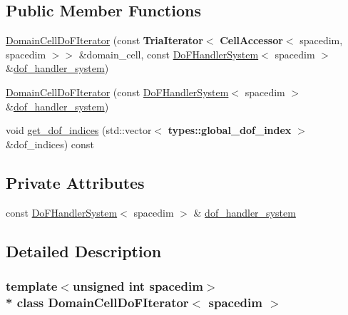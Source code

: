 \subsection*{Public Member Functions}
\begin{DoxyCompactItemize}
\item 
\hyperlink{class_domain_cell_do_f_iterator_a36416883d4c91dd0849520d3e205dba1}{Domain\+Cell\+Do\+F\+Iterator} (const {\bf Tria\+Iterator}$<$ {\bf Cell\+Accessor}$<$ spacedim, spacedim $>$$>$ \&domain\+\_\+cell, const \hyperlink{class_do_f_handler_system}{Do\+F\+Handler\+System}$<$ spacedim $>$ \&\hyperlink{class_domain_cell_do_f_iterator_a7431a0505f1e5b0b796c7f58cf9a060c}{dof\+\_\+handler\+\_\+system})
\item 
\hyperlink{class_domain_cell_do_f_iterator_a4e987bc73bb2c8ec6974cc6427505091}{Domain\+Cell\+Do\+F\+Iterator} (const \hyperlink{class_do_f_handler_system}{Do\+F\+Handler\+System}$<$ spacedim $>$ \&\hyperlink{class_domain_cell_do_f_iterator_a7431a0505f1e5b0b796c7f58cf9a060c}{dof\+\_\+handler\+\_\+system})
\item 
void \hyperlink{class_domain_cell_do_f_iterator_ad93f1a26a4efd4ca94af45d13e250aba}{get\+\_\+dof\+\_\+indices} (std\+::vector$<$ {\bf types\+::global\+\_\+dof\+\_\+index} $>$ \&dof\+\_\+indices) const 
\end{DoxyCompactItemize}
\subsection*{Private Attributes}
\begin{DoxyCompactItemize}
\item 
const \hyperlink{class_do_f_handler_system}{Do\+F\+Handler\+System}$<$ spacedim $>$ \& \hyperlink{class_domain_cell_do_f_iterator_a7431a0505f1e5b0b796c7f58cf9a060c}{dof\+\_\+handler\+\_\+system}
\end{DoxyCompactItemize}


\subsection{Detailed Description}
\subsubsection*{template$<$unsigned int spacedim$>$\\*
class Domain\+Cell\+Do\+F\+Iterator$<$ spacedim $>$}

